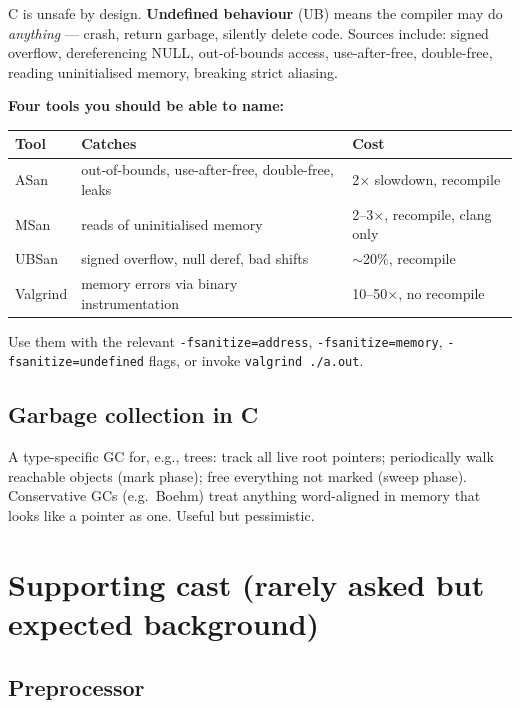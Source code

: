 \documentclass[11pt,a4paper]{article}
\begin{document}
C is unsafe by design. \textbf{Undefined behaviour} (UB) means the compiler may do \emph{anything} --- crash, return garbage, silently delete code. Sources include: signed overflow, dereferencing NULL, out-of-bounds access, use-after-free, double-free, reading uninitialised memory, breaking strict aliasing.

\textbf{Four tools you should be able to name:}

\begin{center}
\begin{tabular}{lll}
\hline
Tool & Catches & Cost \\
\hline
ASan  & out-of-bounds, use-after-free, double-free, leaks & 2$\times$ slowdown, recompile \\
MSan  & reads of uninitialised memory                     & 2--3$\times$, recompile, clang only \\
UBSan & signed overflow, null deref, bad shifts           & $\sim$20\%, recompile \\
Valgrind & memory errors via binary instrumentation       & 10--50$\times$, no recompile \\
\hline
\end{tabular}
\end{center}

Use them with the relevant \verb|-fsanitize=address|, \verb|-fsanitize=memory|, \verb|-fsanitize=undefined| flags, or invoke \verb|valgrind ./a.out|.

\subsection{Garbage collection in C}

A type-specific GC for, e.g., trees: track all live root pointers; periodically walk reachable objects (mark phase); free everything not marked (sweep phase). Conservative GCs (e.g.\ Boehm) treat anything word-aligned in memory that looks like a pointer as one. Useful but pessimistic.

\hrulefill

\section{Supporting cast (rarely asked but expected background)}

\subsection{Preprocessor}
\end{document}
